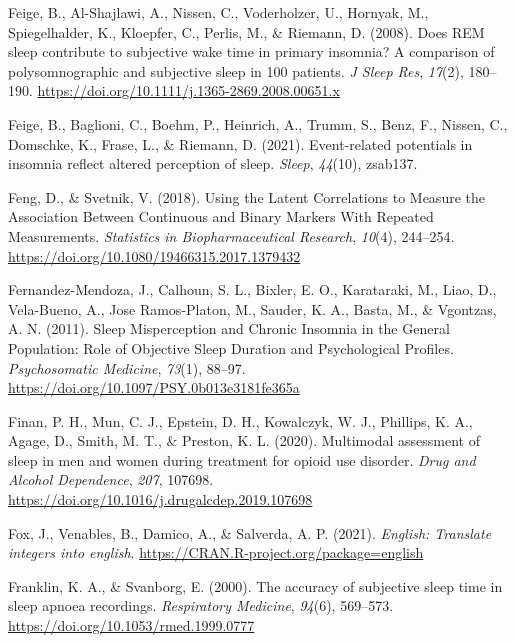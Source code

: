 \documentclass[
]{article}
\newlength{\cslhangindent}
\newenvironment{CSLReferences}[2] %
 {\begin{list}{}{%
  \setlength{\itemindent}{0pt}
  \setlength{\leftmargin}{0pt}
  \setlength{\parsep}{0pt}
  \ifodd #1
   \setlength{\leftmargin}{\cslhangindent}
   \setlength{\itemindent}{-1\cslhangindent}
  \fi
  \setlength{\itemsep}{#2\baselineskip}}}
 {\end{list}}
\begin{document}
\begin{CSLReferences}{1}{0}
Feige, B., Al-Shajlawi, A., Nissen, C., Voderholzer, U., Hornyak, M., Spiegelhalder, K., Kloepfer, C., Perlis, M., \& Riemann, D. (2008). Does {REM} sleep contribute to subjective wake time in primary insomnia? {A} comparison of polysomnographic and subjective sleep in 100 patients. \emph{J Sleep Res}, \emph{17}(2), 180--190. \url{https://doi.org/10.1111/j.1365-2869.2008.00651.x}

Feige, B., Baglioni, C., Boehm, P., Heinrich, A., Trumm, S., Benz, F., Nissen, C., Domschke, K., Frase, L., \& Riemann, D. (2021). Event-related potentials in insomnia reflect altered perception of sleep. \emph{Sleep}, \emph{44}(10), zsab137.

Feng, D., \& Svetnik, V. (2018). Using the {Latent} {Correlations} to {Measure} the {Association} {Between} {Continuous} and {Binary} {Markers} {With} {Repeated} {Measurements}. \emph{Statistics in Biopharmaceutical Research}, \emph{10}(4), 244--254. \url{https://doi.org/10.1080/19466315.2017.1379432}

Fernandez-Mendoza, J., Calhoun, S. L., Bixler, E. O., Karataraki, M., Liao, D., Vela-Bueno, A., Jose Ramos-Platon, M., Sauder, K. A., Basta, M., \& Vgontzas, A. N. (2011). Sleep {Misperception} and {Chronic} {Insomnia} in the {General} {Population}: {Role} of {Objective} {Sleep} {Duration} and {Psychological} {Profiles}. \emph{Psychosomatic Medicine}, \emph{73}(1), 88--97. \url{https://doi.org/10.1097/PSY.0b013e3181fe365a}

Finan, P. H., Mun, C. J., Epstein, D. H., Kowalczyk, W. J., Phillips, K. A., Agage, D., Smith, M. T., \& Preston, K. L. (2020). Multimodal assessment of sleep in men and women during treatment for opioid use disorder. \emph{Drug and Alcohol Dependence}, \emph{207}, 107698. \url{https://doi.org/10.1016/j.drugalcdep.2019.107698}

Fox, J., Venables, B., Damico, A., \& Salverda, A. P. (2021). \emph{English: Translate integers into english}. \url{https://CRAN.R-project.org/package=english}

Franklin, K. A., \& Svanborg, E. (2000). The accuracy of subjective sleep time in sleep apnoea recordings. \emph{Respiratory Medicine}, \emph{94}(6), 569--573. \url{https://doi.org/10.1053/rmed.1999.0777}


\end{CSLReferences}
\end{document}
